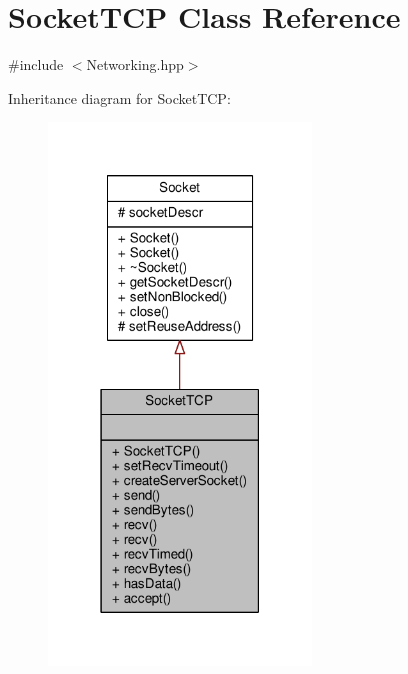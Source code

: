 \hypertarget{class_socket_t_c_p}{\section{Socket\-T\-C\-P Class Reference}
\label{class_socket_t_c_p}
}


{\ttfamily \#include $<$Networking.\-hpp$>$}



Inheritance diagram for Socket\-T\-C\-P\-:
\nopagebreak
\begin{figure}[H]
\begin{center}
\leavevmode
\includegraphics[width=198pt]{class_socket_t_c_p__inherit__graph}
\end{center}
\end{figure}


